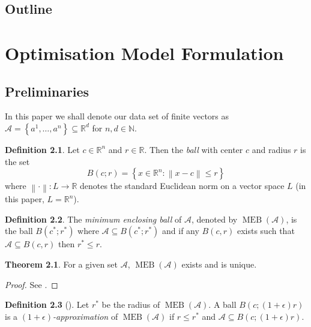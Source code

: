 \documentclass[11pt,twoside]{report}
\newcommand{\A}{\mathcal{A}} %
\newcommand{\norm}[1]{\left\lVert#1\right\rVert}
\DeclareMathOperator{\MEB}{MEB}
\theoremstyle{definition}
\newtheorem{definition}{Definition}
\newtheorem{theorem}{Theorem}
\numberwithin{theorem}{section}
\numberwithin{definition}{section}
\numberwithin{lemma}{section}
\numberwithin{algorithm}{section}
\numberwithin{equation}{section}
\begin{document}
\section{Outline}

\chapter{Optimisation Model Formulation}
\section{Preliminaries}
In this paper we shall denote our data set of finite vectors as $\mathcal{A} = \left\{a^1,\ldots,a^n\right\}\subseteq\mathbb{R}^d$ for $n,d\in\mathbb{N}$.

\begin{definition}
Let $c\in\mathbb{R}^n$ and $r\in\mathbb{R}$. Then the \textit{ball} with center $c$ and radius $r$ is the set
\begin{equation*}
    B(c;r) = \left\{x\in\mathbb{R}^n : \norm{x-c} \leq r\right\}
\end{equation*}
where $\norm{\cdot}:L\to\mathbb{R}$ denotes the standard Euclidean norm on a vector space $L$ (in this paper, $L=\mathbb{R}^n$).
\end{definition}

\begin{definition}
The \textit{minimum enclosing ball} of $\A$, denoted by $\MEB(\A)$, is the ball $B(c^*;r^*)$ where $\A\subseteq B(c^*;r^*)$ and if any $B(c,r)$ exists such that $\mathcal{A}\subseteq B(c,r)$ then $r^*\leq r$.
\end{definition}

\begin{theorem}
For a given set $\A$, $\MEB(\A)$ exists and is unique.
\end{theorem}
\begin{proof}
See \cite[page 5]{two-algorithms}.
\end{proof}

\begin{definition}[{{\cite[page 2]{core-sets}}}]
Let $r^*$ be the radius of $\MEB(\A)$. A ball $B(c;(1+\epsilon)r)$ is a \textit{$(1+\epsilon)$-approximation} of $\MEB(\A)$ if $r\leq r^*$ and $\mathcal{A}\subseteq B(c;(1+\epsilon)r)$.
\end{definition}
\end{document}
